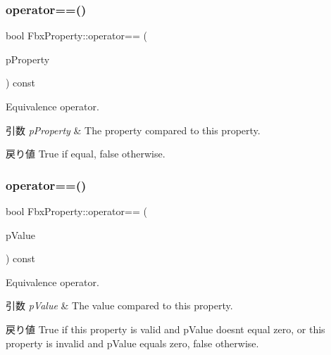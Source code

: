 \subsubsection{\texorpdfstring{operator==()}{operator==()}\hspace{0.1cm}{\footnotesize\ttfamily [1/2]}}
{\footnotesize\ttfamily bool Fbx\+Property\+::operator== (\begin{DoxyParamCaption}\item[{const \hyperlink{class_fbx_property}{Fbx\+Property} \&}]{p\+Property }\end{DoxyParamCaption}) const}

Equivalence operator. 
\begin{DoxyParams}{引数}
{\em p\+Property} & The property compared to this property. \\
\hline
\end{DoxyParams}
\begin{DoxyReturn}{戻り値}
{\ttfamily True} if equal, {\ttfamily false} otherwise. 
\end{DoxyReturn}
\mbox{\label{class_fbx_property_a027c88dfbe6dc8283307ec81edf79159}} 
\subsubsection{\texorpdfstring{operator==()}{operator==()}\hspace{0.1cm}{\footnotesize\ttfamily [2/2]}}
{\footnotesize\ttfamily bool Fbx\+Property\+::operator== (\begin{DoxyParamCaption}\item[{int}]{p\+Value }\end{DoxyParamCaption}) const\hspace{0.3cm}{\ttfamily [inline]}}

Equivalence operator. 
\begin{DoxyParams}{引数}
{\em p\+Value} & The value compared to this property. \\
\hline
\end{DoxyParams}
\begin{DoxyReturn}{戻り値}
{\ttfamily True} if this property is valid and p\+Value doesn\textquotesingle{}t equal zero, or this property is invalid and p\+Value equals zero, {\ttfamily false} otherwise. 
\end{DoxyReturn}


